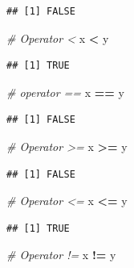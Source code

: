 \documentclass[12pt,]{krantz}
\newenvironment{Shaded}{\begin{snugshade}}{\end{snugshade}}
\newcommand{\CommentTok}[1]{\textcolor[rgb]{0.56,0.35,0.01}{\textit{#1}}}
\newcommand{\NormalTok}[1]{#1}
\newcommand{\OperatorTok}[1]{\textcolor[rgb]{0.81,0.36,0.00}{\textbf{#1}}}
\newcommand{\StringTok}[1]{\textcolor[rgb]{0.31,0.60,0.02}{#1}}
\begin{document}
\begin{verbatim}
## [1] FALSE
\end{verbatim}

\begin{Shaded}
\begin{Highlighting}[]
\CommentTok{# Operator <}
\NormalTok{x }\OperatorTok{<}\StringTok{ }\NormalTok{y}
\end{Highlighting}
\end{Shaded}

\begin{verbatim}
## [1] TRUE
\end{verbatim}

\begin{Shaded}
\begin{Highlighting}[]
\CommentTok{# operator ==}
\NormalTok{x }\OperatorTok{==}\StringTok{ }\NormalTok{y}
\end{Highlighting}
\end{Shaded}

\begin{verbatim}
## [1] FALSE
\end{verbatim}

\begin{Shaded}
\begin{Highlighting}[]
\CommentTok{# Operator >=}
\NormalTok{x }\OperatorTok{>=}\StringTok{ }\NormalTok{y}
\end{Highlighting}
\end{Shaded}

\begin{verbatim}
## [1] FALSE
\end{verbatim}

\begin{Shaded}
\begin{Highlighting}[]
\CommentTok{# Operator <=}
\NormalTok{x }\OperatorTok{<=}\StringTok{ }\NormalTok{y}
\end{Highlighting}
\end{Shaded}

\begin{verbatim}
## [1] TRUE
\end{verbatim}

\begin{Shaded}
\begin{Highlighting}[]
\CommentTok{# Operator !=}
\NormalTok{x }\OperatorTok{!=}\StringTok{ }\NormalTok{y}
\end{Highlighting}
\end{Shaded}
\end{document}
